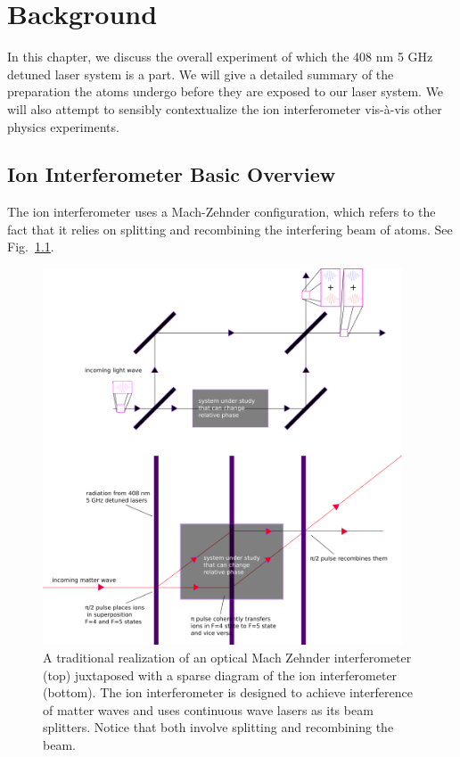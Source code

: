 
\chapter{Background}
In this chapter, we discuss the overall experiment of which the 408 nm 5 GHz detuned laser system is a part. We will give a detailed summary of the preparation the atoms undergo before they are exposed to our laser system. We will also attempt to sensibly contextualize the ion interferometer vis-\`a-vis other physics experiments. 

\section{Ion Interferometer Basic Overview}
The ion interferometer uses a Mach-Zehnder configuration, which refers to the fact that it relies on splitting and recombining the interfering beam of atoms. See Fig.\ \ref{mach-zehnder-fig}. 


\begin{figure}
\centerline{
\includegraphics[width=0.95\textwidth]{mach-zehnder}}
\caption[Optical and Matterwave Mach Zehnder interferometers]{\label{mach-zehnder-fig}A traditional realization of an optical Mach Zehnder interferometer (top) juxtaposed with a sparse diagram of the ion interferometer (bottom). The ion interferometer is designed to achieve interference of matter waves and uses continuous wave lasers as its beam splitters. Notice that both involve splitting and recombining the beam. }
\end{figure}


